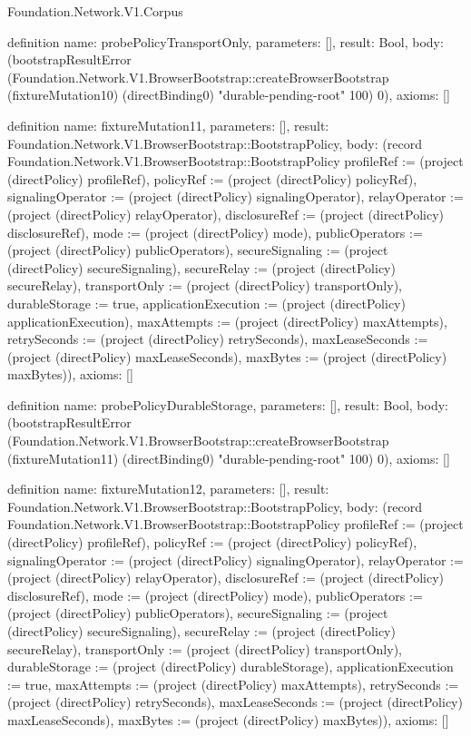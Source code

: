 \begin{lexlean}{Foundation.Network.V1.Corpus}
\begin{semanticmodule}
definition{
  name: probePolicyTransportOnly,
  parameters: [],
  result: Bool,
  body: (bootstrapResultError (Foundation.Network.V1.BrowserBootstrap::createBrowserBootstrap (fixtureMutation10) (directBinding0) "durable-pending-root" 100) 0),
  axioms: []
}

definition{
  name: fixtureMutation11,
  parameters: [],
  result: Foundation.Network.V1.BrowserBootstrap::BootstrapPolicy,
  body: (record Foundation.Network.V1.BrowserBootstrap::BootstrapPolicy {profileRef := (project (directPolicy) profileRef), policyRef := (project (directPolicy) policyRef), signalingOperator := (project (directPolicy) signalingOperator), relayOperator := (project (directPolicy) relayOperator), disclosureRef := (project (directPolicy) disclosureRef), mode := (project (directPolicy) mode), publicOperators := (project (directPolicy) publicOperators), secureSignaling := (project (directPolicy) secureSignaling), secureRelay := (project (directPolicy) secureRelay), transportOnly := (project (directPolicy) transportOnly), durableStorage := true, applicationExecution := (project (directPolicy) applicationExecution), maxAttempts := (project (directPolicy) maxAttempts), retrySeconds := (project (directPolicy) retrySeconds), maxLeaseSeconds := (project (directPolicy) maxLeaseSeconds), maxBytes := (project (directPolicy) maxBytes)}),
  axioms: []
}

definition{
  name: probePolicyDurableStorage,
  parameters: [],
  result: Bool,
  body: (bootstrapResultError (Foundation.Network.V1.BrowserBootstrap::createBrowserBootstrap (fixtureMutation11) (directBinding0) "durable-pending-root" 100) 0),
  axioms: []
}

definition{
  name: fixtureMutation12,
  parameters: [],
  result: Foundation.Network.V1.BrowserBootstrap::BootstrapPolicy,
  body: (record Foundation.Network.V1.BrowserBootstrap::BootstrapPolicy {profileRef := (project (directPolicy) profileRef), policyRef := (project (directPolicy) policyRef), signalingOperator := (project (directPolicy) signalingOperator), relayOperator := (project (directPolicy) relayOperator), disclosureRef := (project (directPolicy) disclosureRef), mode := (project (directPolicy) mode), publicOperators := (project (directPolicy) publicOperators), secureSignaling := (project (directPolicy) secureSignaling), secureRelay := (project (directPolicy) secureRelay), transportOnly := (project (directPolicy) transportOnly), durableStorage := (project (directPolicy) durableStorage), applicationExecution := true, maxAttempts := (project (directPolicy) maxAttempts), retrySeconds := (project (directPolicy) retrySeconds), maxLeaseSeconds := (project (directPolicy) maxLeaseSeconds), maxBytes := (project (directPolicy) maxBytes)}),
  axioms: []
}


\end{semanticmodule}
\end{lexlean}
